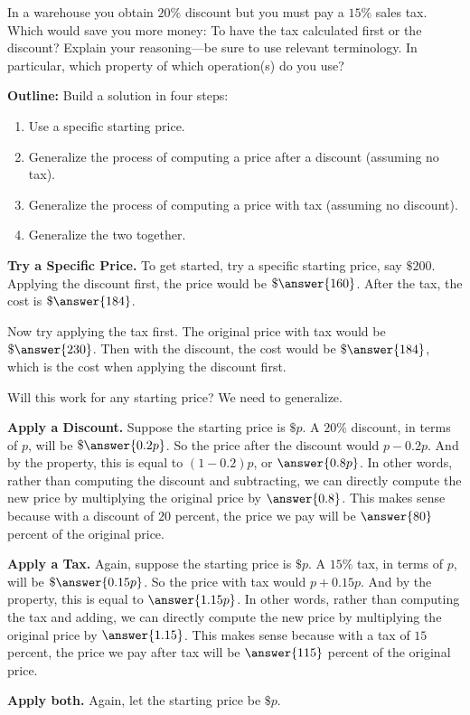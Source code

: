 \documentclass[nooutcomes]{ximera}
\begin{document}
\begin{problem}In a warehouse you obtain $20\%$ discount but you must pay a
  $15\%$ sales tax. Which would save you more money: To have the tax
  calculated first or the discount? Explain your reasoning---be sure
  to use relevant terminology.  In particular, which property 
of which operation(s) do you use?  

\textbf{Outline:}  Build a solution in four steps: 
\begin{enumerate}
\item Use a specific starting price. 
\item Generalize the process of computing a price after a discount (assuming no tax).  
\item Generalize the process of computing a price with tax (assuming no discount). 
\item Generalize the two together. 
\end{enumerate}
\textbf{Try a Specific Price.}
To get started, try a specific starting price, say $\$200$.  Applying the discount first, the price would be $\$\answer{160}$.  After the tax, the cost is $\$\answer{184}$.  

Now try applying the tax first.  The original price with tax would be $\$\answer{230}$.  Then with the discount, the cost would be $\$\answer{184}$, which is  the cost when applying the discount first.  

Will this work for any starting price?  We need to generalize.  

\begin{problem}
\textbf{Apply a Discount.}
Suppose the starting price is $\$p$.  A $20\%$ discount, in terms of $p$, will be $\$\answer{0.2p}$.  So the price after the discount would $p - 0.2p$.  And by the  property, this is equal to $(1-0.2)p$, or $\answer{0.8p}$.  In other words, rather than computing the discount and subtracting, we can directly compute the new price by multiplying the original price by $\answer{0.8}$.  This makes sense because with a discount of $20$ percent, the price we pay will be $\answer{80}$ percent of the original price.  
\begin{problem}
\textbf{Apply a Tax.}
Again, suppose the starting price is $\$p$.  A $15\%$ tax, in terms of $p$, will be $\$\answer{0.15p}$.  So the price with tax would $p + 0.15p$.  And by the  property, this is equal to $\answer{1.15p}$.  In other words, rather than computing the tax and adding, we can directly compute the new price by multiplying the original price by $\answer{1.15}$.  This makes sense because with a tax of $15$ percent, the price we pay after tax will be $\answer{115}$ percent of the original price.  
\begin{problem}
\textbf{Apply both.} Again, let the starting price be $\$p$.  


\end{problem}
\end{problem}
\end{problem}
\end{problem}
\end{document}
